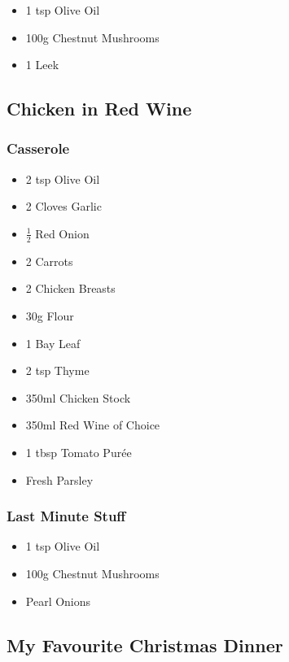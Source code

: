 \documentclass[11pt, english]{article}
\begin{document}
	\begin{itemize}
	\setlength\itemsep{0cm}
		\item 1 tsp Olive Oil
		\item 100g Chestnut Mushrooms
		\item 1 Leek
	\end{itemize}

\newpage

	\subsection{Chicken in Red Wine}

		\subsubsection*{Casserole}

	\begin{itemize}
	\setlength\itemsep{0cm}
		\item 2 tsp Olive Oil
		\item 2 Cloves Garlic
		\item $\frac{1}{2}$ Red Onion
		\item 2 Carrots
		\item 2 Chicken Breasts
		\item 30g Flour
		\item 1 Bay Leaf
		\item 2 tsp Thyme
		\item 350ml Chicken Stock
		\item 350ml Red Wine of Choice
		\item 1 tbsp Tomato Pur\'{e}e 
		\item Fresh Parsley
	\end{itemize}

		\subsubsection*{Last Minute Stuff}

	\begin{itemize}
	\setlength\itemsep{0cm}
		\item 1 tsp Olive Oil
		\item 100g Chestnut Mushrooms
		\item Pearl Onions
	\end{itemize}

\newpage

	\subsection{My Favourite Christmas Dinner}
\end{document}
